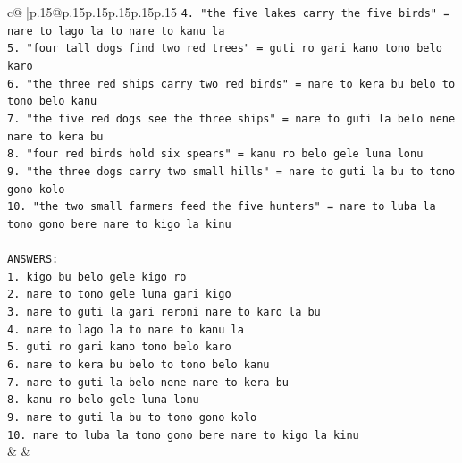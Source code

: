 \documentclass{article}
\begin{document}
{\begin{supertabular}{c@{$\;$}|p{.15\linewidth}@{}p{.15\linewidth}p{.15\linewidth}p{.15\linewidth}p{.15\linewidth}p{.15\linewidth}}
{{{\texttt{4. "the five lakes carry the five birds" = nare to lago la to nare to kanu la} \\
\texttt{5. "four tall dogs find two red trees" = guti ro gari kano tono belo karo} \\
\texttt{6. "the three red ships carry two red birds" = nare to kera bu belo to tono belo kanu} \\
\texttt{7. "the five red dogs see the three ships" = nare to guti la belo nene nare to kera bu} \\
\texttt{8. "four red birds hold six spears" = kanu ro belo gele luna lonu} \\
\texttt{9. "the three dogs carry two small hills" = nare to guti la bu to tono gono kolo} \\
\texttt{10. "the two small farmers feed the five hunters" = nare to luba la tono gono bere nare to kigo la kinu} \\
\\ 
\texttt{ANSWERS:} \\
\texttt{1. kigo bu belo gele kigo ro} \\
\texttt{2. nare to tono gele luna gari kigo} \\
\texttt{3. nare to guti la gari reroni nare to karo la bu} \\
\texttt{4. nare to lago la to nare to kanu la} \\
\texttt{5. guti ro gari kano tono belo karo} \\
\texttt{6. nare to kera bu belo to tono belo kanu} \\
\texttt{7. nare to guti la belo nene nare to kera bu} \\
\texttt{8. kanu ro belo gele luna lonu} \\
\texttt{9. nare to guti la bu to tono gono kolo} \\
\texttt{10. nare to luba la tono gono bere nare to kigo la kinu} \\
            }
        }
    }
    & & \\ \\


\end{supertabular}}
\end{document}
